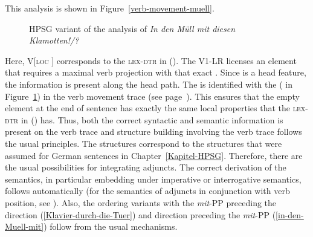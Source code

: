 \begin{exe}
\begin{xlist}[iv.]
\begin{exe}
\begin{xlist}[iv.]
This analysis is shown in Figure~\vref{verb-movement-muell}.
\begin{figure}[t]
\caption{\label{verb-movement-muell}HPSG variant of the analysis of \emph{In den Müll mit diesen Klamotten!/?}}
\end{figure}%
Here, V[\textsc{loc} ] corresponds to the \textsc{lex-dtr} in (). The V1-LR licenses an element that requires a maximal verb projection
with that exact \dslv {}. Since \dsl is a head feature, the information is present along the head path. The \dslv is identified with the \localv
( in Figure~\ref{verb-movement-muell}) in the verb movement trace (see page~\pageref{le-verbspur}). 
This ensures that the empty element at the end of sentence has exactly the same local properties that the \textsc{lex-dtr} in () has.
Thus, both the correct syntactic and semantic information is present on the verb trace and structure
building involving the verb trace follows the usual principles.
The structures correspond to the structures that were assumed for German sentences in Chapter~\ref{Kapitel-HPSG}.
Therefore, there are the usual possibilities for integrating adjuncts. The correct derivation of the semantics, in particular embedding under
imperative or interrogative semantics, follows automatically (for the semantics of adjuncts in conjunction with verb position, see  ). 
Also, the ordering variants with the \emph{mit}-PP preceding the direction (\ref{Klavier-durch-die-Tuer}) and direction preceding the 
\emph{mit}-PP (\ref{in-den-Muell-mit}) follow from the usual mechanisms.


\end{xlist}
\end{exe}
\end{xlist}
\end{exe}

